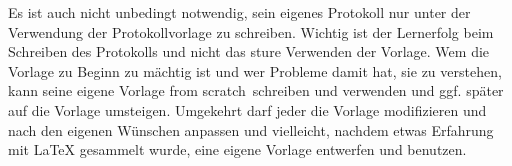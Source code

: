 Es ist auch nicht unbedingt notwendig, sein eigenes Protokoll nur unter der Verwendung der Protokollvorlage zu schreiben. Wichtig ist der Lernerfolg beim Schreiben des Protokolls und nicht das sture Verwenden der Vorlage. Wem die Vorlage zu Beginn zu mächtig ist und wer Probleme damit hat, sie zu verstehen, kann seine eigene Vorlage \glqq from scratch\grqq\ schreiben und verwenden und ggf. später auf die Vorlage umsteigen. Umgekehrt darf jeder die Vorlage modifizieren und nach den eigenen Wünschen anpassen und vielleicht, nachdem etwas Erfahrung mit LaTeX gesammelt wurde, eine eigene Vorlage entwerfen und benutzen.